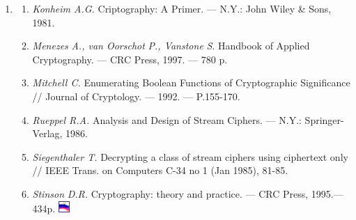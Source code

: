 \bigskip


\bigskip

\liststyleWWviiiNumli
\setcounter{saveenum}{\value{enumi}}
\begin{enumerate}
\setcounter{enumi}{\value{saveenum}}
\item \begin{enumerate}
\item \textit{Konheim A.G.} Criptography: A Primer. --- N.Y.: John Wiley \& Sons,
1981.
\item \textit{Menezes}\textit{ }\textit{A., van Oorschot}\textit{ }\textit{P.,
Vanstone}\textit{ }\textit{S}.  Handbook of  Applied Cryptography. --- CRC Press,
1997. --- 780 p.
\item \textit{Mitchell C.} Enumerating Boolean Functions of Cryptographic
Significance // Journal of Cryptology. --- 1992. --- P.155-170.
\item \textit{Rueppel R.A.} Analysis and Design of Stream Ciphers. --- N.Y.:
Springer-Verlag, 1986.
\item \textit{S}\textit{iegenthaler T.} Decrypting a class of stream ciphers
using ciphertext only // IEEE Trans. on Computers C-34 no 1 (Jan 1985), 81-85.
\item \textit{Stinson}\textit{ }\textit{D.R.} Cryptography: theory and practice.
--- CRC Press, 1995.--- 434p.
\includegraphics[width=0.1665in,height=0.1665in]{crypt-img/crypt-img341.png} 
\end{enumerate}
\end{enumerate}

